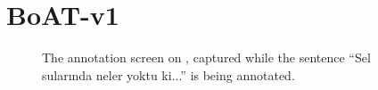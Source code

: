\section{BoAT-v1}
\label{sec:appendix-a}

\begin{figure}[th!]
    \centering
    \caption{The annotation screen on \boatvone, captured while the sentence ``Sel sularında neler yoktu ki...'' is being annotated.}
    \label{fig:anno-fig-v1}
\end{figure}
